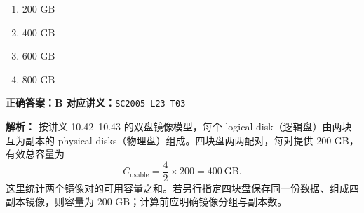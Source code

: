 \documentclass[11pt,a4paper,fontset=fandol]{ctexart}
\renewenvironment{checkedsolution}
  {\par\nopagebreak[4]\textbf{解析：}\ignorespaces}
  {\par}
\begin{document}
\begin{enumerate}[label=\Alph*.,leftmargin=2.4em]
  \item 200 GB
  \item 400 GB
  \item 600 GB
  \item 800 GB
\end{enumerate}

\textbf{正确答案：B}\qquad
\textbf{对应讲义：}\texttt{SC2005-L23-T03}

\begin{checkedsolution}
按讲义 10.42--10.43 的双盘镜像模型，每个 logical disk（逻辑盘）由两块互为副本的 physical disks（物理盘）组成。四块盘两两配对，每对提供 200 GB，有效总容量为
\[
  C_{\mathrm{usable}}=\frac{4}{2}\times200=400\ \text{GB}.
\]
这里统计两个镜像对的可用容量之和。若另行指定四块盘保存同一份数据、组成四副本镜像，则容量为 200 GB；计算前应明确镜像分组与副本数。
\end{checkedsolution}
\end{document}
